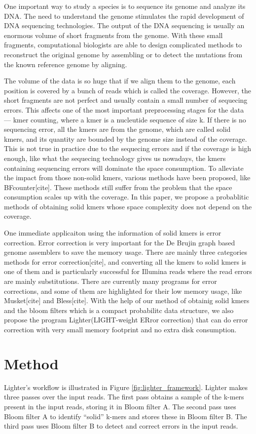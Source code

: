 \documentclass[10pt]{article}
\begin{document}
One important way to study a species is to sequence its genome and analyze its DNA. The need to understand the genome stimulates the rapid development of DNA sequencing technologies. The output of the DNA sequencing is usually an enormous volume of short fragments from the genome. With these small fragments, computational biologists are able to design complicated methods to reconstruct the original genome by assembling or to detect the mutations from the known reference genome by aligning.

The volume of the data is so huge that if we align them to the genome, each position is covered by a bunch of reads which is called the coverage. However, the short fragments are not perfect and usually contain a small number of sequecing errors. This affects one of the most important preprocessing stages for the data --- kmer counting, where a kmer is a nucleutide sequence of size k. If there is no sequencing error, all the kmers are from the genome, which are called solid kmers, and its quantity are bounded by the genome size instead of the coverage. This is not true in practice due to the sequecing errors and if the coverage is high enough, like what the sequecing technology gives us nowadays, the kmers containing sequencing errors will dominate the space consumption. To alleviate the impact from those non-solid kmers, various methods have been proposed, like BFcounter[cite]. These methods still suffer from the problem that the space consumption scales up with the coverage. In this paper, we propose a probablitic methods of obtaining solid kmers whose space complexity does not depend on the coverage.

One immediate applicaiton using the information of solid kmers is error correction. Error correction is very important for the De Brujin graph based genome assemblers to save the memory usage. There are mainly three categories methods for error correction[cite], and converting all the kmers to solid kmers is one of them and is particularly successful for Illumina reads where the read errors are mainly substitutions. There are currently many programs for error corrections, and some of them are highlighted for their low memory usage, like Musket[cite] and Bless[cite]. With the help of our method of obtainig solid kmers and the bloom filters which is a compact probabilitc data structure, we also propose the program Lighter(LIGHT-weight ERror correction) that can do error correction with very small memory footprint and no extra disk consumption.

\section*{Method}
Lighter's workflow is illustrated in Figure \ref{fig:lighter_framework}. Lighter makes three passes over the input reads.  The first pass obtains a sample of the k-mers present in the input reads, storing it in Bloom filter A.  The second pass uses Bloom filter A to identify ``solid'' k-mers and stores these in Bloom filter B.  The third pass uses Bloom filter B to detect and correct errors in the input reads.
\end{document}
